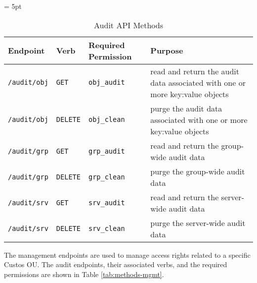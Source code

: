 \begin{table}[!tb]
  \vspace{1ex}
  \begin{center}
    \tabulinesep = 5pt
    \begin{tabu} to \textwidth
      { | X[1,l,m]
        | X[.5,l,m]
        | X[1,l,m]
        | X[2,l,m]
        | }
      \hline
      \textbf{Endpoint}
      & \textbf{Verb}
      & \textbf{Required Permission}
      & \textbf{Purpose}
      \\ \hline
      \texttt{/audit/obj} & \texttt{GET} & \texttt{obj\_audit}
      & read and return the audit data associated with one or more key:value objects
      \\ \hline
      \texttt{/audit/obj} & \texttt{DELETE} & \texttt{obj\_clean}
      & purge the audit data associated with one or more key:value objects
      \\ \hline
      \texttt{/audit/grp} & \texttt{GET} & \texttt{grp\_audit}
      & read and return the group-wide audit data
      \\ \hline
      \texttt{/audit/grp} & \texttt{DELETE} & \texttt{grp\_clean}
      & purge the group-wide audit data
      \\ \hline
      \texttt{/audit/srv} & \texttt{GET} & \texttt{srv\_audit}
      & read and return the server-wide audit data
      \\ \hline
      \texttt{/audit/srv} & \texttt{DELETE} & \texttt{srv\_clean}
      & purge the server-wide audit data
      \\ \hline
    \end{tabu}
  \end{center}
  \caption{Audit API Methods}
  \label{tab:methods-audit}
\end{table}

The management endpoints are used to manage access rights related to a
specific Custos OU. The audit endpoints, their associated verbs, and
the required permissions are shown in Table \ref{tab:methods-mgmt}.

